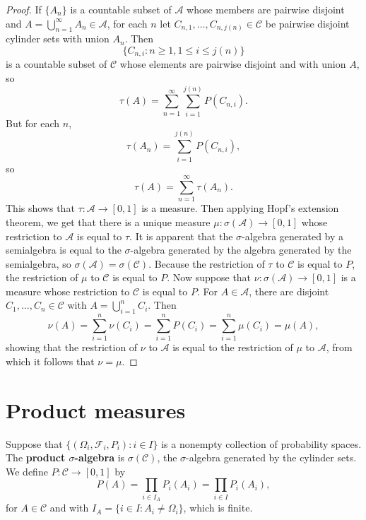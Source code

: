 \documentclass{article}
\theoremstyle{definition}
\begin{document}
\begin{proof}
If $\{A_n\}$ is a countable subset of $\mathscr{A}$ whose members are pairwise disjoint and
$A=\bigcup_{n=1}^\infty A_n \in \mathscr{A}$, 
for each $n$ let $C_{n,1}, \ldots, C_{n,j(n)} \in \mathscr{C}$ be pairwise disjoint cylinder sets with union
$A_n$. Then
\[
\{C_{n,i}: n \geq 1, 1 \leq i \leq j(n)\}
\]
 is a countable subset of $\mathscr{C}$ whose elements are pairwise
disjoint and with union $A$, so
\[
\tau(A) = \sum_{n=1}^\infty \sum_{i=1}^{j(n)} P(C_{n,i}).
\]
But for each $n$, 
\[
\tau(A_n) = \sum_{i=1}^{j(n)} P(C_{n,i}),
\]
so
\[
\tau(A) = \sum_{n=1}^\infty \tau(A_n).
\]
This shows that $\tau:\mathscr{A} \to [0,1]$ is a measure. 
Then applying Hopf's extension theorem, we get that there is a unique measure $\mu:\sigma(\mathscr{A}) \to [0,1]$ 
whose restriction to $\mathscr{A}$ is equal to $\tau$. 
It is apparent that the $\sigma$-algebra generated by a semialgebra is equal to the $\sigma$-algebra generated by the algebra generated
by the semialgebra, so $\sigma(\mathscr{A})=\sigma(\mathscr{C})$.  Because the restriction of $\tau$ to $\mathscr{C}$ is equal to
$P$, the restriction of $\mu$ to $\mathscr{C}$ is equal to $P$. Now suppose that
$\nu:\sigma(\mathscr{A}) \to [0,1]$ is a measure whose restriction to $\mathscr{C}$ is equal to $P$.
For $A \in \mathscr{A}$, there are disjoint $C_1,\ldots,C_n \in \mathscr{C}$ with $A=\bigcup_{i=1}^n C_i$. 
Then
\[
\nu(A) = \sum_{i=1}^n \nu(C_i) = \sum_{i=1}^n P(C_i) = \sum_{i=1}^n \mu(C_i)
=\mu(A),
\]
showing that the restriction of $\nu$ to $\mathscr{A}$ is equal to the restriction of $\mu$ to $\mathscr{A}$, from which it follows
that $\nu=\mu$.
\end{proof}



\section{Product measures}
Suppose that $\{(\Omega_i,\mathscr{F}_i,P_i): i \in I\}$ is a nonempty collection of probability spaces. The \textbf{product $\sigma$-algebra} 
is $\sigma(\mathscr{C})$, the $\sigma$-algebra generated by the cylinder sets. We define $P:\mathscr{C} \to [0,1]$ by
\[
P(A) = \prod_{i \in I_A} P_i(A_i) = \prod_{i \in I} P_i(A_i),
\]
for $A \in \mathscr{C}$ and with $I_A=\{i \in I: A_i \neq \Omega_i\}$, which is finite. 
\end{document}
